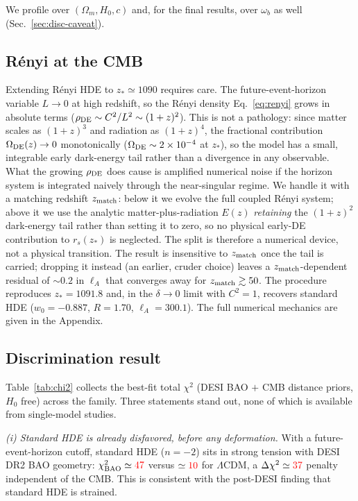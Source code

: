 \documentclass[twocolumn,10pt]{article}
\newcommand{\prov}[1]{\textcolor{red}{#1}}
\begin{document}
We profile over $(\Omega_m,H_0,c)$ and, for the final results, over
$\omega_b$ as well (Sec.~\ref{sec:disc-caveat}).

\subsection{R\'enyi at the CMB}

Extending R\'enyi HDE to $z_*\simeq1090$ requires care. The future-event-horizon
variable $L\to0$ at high redshift, so the R\'enyi density
Eq.~\eqref{eq:renyi} grows in absolute terms ($\rho_{\rm DE}\sim C^2/L^2\sim
(1+z)^2$). This is not a pathology: since matter scales as $(1+z)^3$ and
radiation as $(1+z)^4$, the fractional contribution $\Omega_{\rm DE}(z)\to0$
monotonically ($\Omega_{\rm DE}\sim2\times10^{-4}$ at $z_*$), so the model has a
small, integrable early dark-energy tail rather than a divergence in any
observable. What the growing $\rho_{\rm DE}$ does cause is amplified numerical
noise if the horizon system is integrated naively through the near-singular
regime. We handle it with a matching redshift $z_{\rm match}$: below it we
evolve the full coupled R\'enyi system; above it we use the analytic
matter-plus-radiation $E(z)$ \emph{retaining} the $(1+z)^2$ dark-energy tail
rather than setting it to zero, so no physical early-DE contribution to
$r_s(z_*)$ is neglected. The split is therefore a numerical device, not a
physical transition. The result is insensitive to $z_{\rm match}$ once the tail
is carried; dropping it instead (an earlier, cruder choice) leaves a
$z_{\rm match}$-dependent residual of $\sim0.2$ in $\ell_A$ that converges away
for $z_{\rm match}\gtrsim50$. The procedure reproduces $z_*=1091.8$ and, in the
$\delta\to0$ limit with $C^2=1$, recovers standard HDE ($w_0=-0.887$,
$R=1.70$, $\ell_A=300.1$). The full numerical mechanics are given in the
Appendix.

\subsection{Discrimination result}
\label{sec:discrim-result}

Table~\ref{tab:chi2} collects the best-fit total $\chi^2$ (DESI BAO $+$ CMB
distance priors, $H_0$ free) across the family. Three statements stand out,
none of which is available from single-model studies.

\emph{(i) Standard HDE is already disfavored, before any deformation.} With a
future-event-horizon cutoff, standard HDE ($n=-2$) sits in strong tension with
DESI DR2 BAO geometry: $\chi^2_{\rm BAO}\simeq\prov{47}$ versus
$\simeq\prov{10}$ for $\Lambda$CDM, a $\Delta\chi^2\simeq\prov{37}$ penalty
independent of the CMB. This is consistent with the post-DESI finding that
standard HDE is strained.
\end{document}
